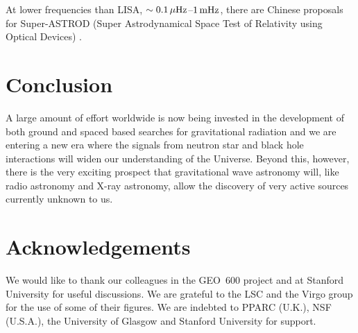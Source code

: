 \documentclass{article}
\begin{document}
At lower frequencies than LISA, $\sim0.1\,\mu{\rm Hz}$--$1\,{\rm mHz}$, there are 
Chinese proposals for Super-ASTROD (Super Astrodynamical Space Test of 
Relativity using Optical Devices) \cite{Ni:2009}.


\newpage

\section{Conclusion}
\label{section:conclusion}

A large amount of effort worldwide is now being invested in the development of
both ground and spaced based searches for gravitational radiation and we are
entering a new era where the signals from neutron star and black hole
interactions will widen our understanding of the Universe. Beyond this, however,
there is the very exciting prospect that gravitational wave astronomy will, like
radio astronomy and X-ray astronomy, allow the discovery of very active sources
currently unknown to us.




\newpage

\section{Acknowledgements}
\label{section:acknowledgements}

We would like to thank our colleagues in the GEO~600 project and at Stanford
University for useful discussions. We are grateful to the LSC and the Virgo
group for the use of some of their figures. We are indebted to PPARC (U.K.), NSF
(U.S.A.), the University of Glasgow and Stanford University for support.




\newpage


\end{document}
